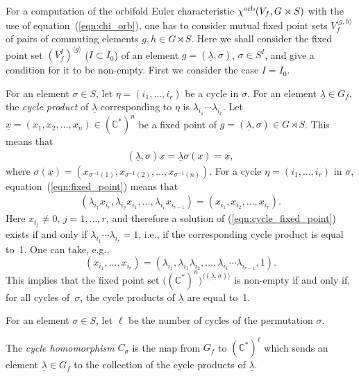 \documentclass[pdftex]{sigma}
\numberwithin{equation}{section}
\begin{document}
For a computation of the orbifold Euler characteristic ${\chi}^{\rm orb}(V_f, G \rtimes S)$ with the use of
equation~(\ref{eqn:chi_orb}), one has to consider mutual fixed point sets $V_f^{\langle g,h\rangle}$ of pairs of
commuting elements $g, h\in G \rtimes S$. Here we shall consider the fixed point set
$(V_f^I)^{\langle g\rangle}$ ($I\subset I_0$) of an element $g=(\underline{\lambda}, \sigma)$, $\sigma \in S^I$,
and give a condition for it to be non-empty. First we consider the case $I=I_0$.

For an element $\sigma\in S$, let $\eta=(i_1,\dots, i_r)$ be a cycle in $\sigma$. For an element
$\underline{\lambda}\in G_f$, the {\em cycle product} of $\underline{\lambda}$ corresponding to $\eta$ is
$\lambda_{i_1}\cdots \lambda_{i_r}$. Let $\underline{x}=(x_1, x_2,\dots, x_n)\in ({\mathbb C}^*)^n$ be a fixed point of $g=(\underline{\lambda}, \sigma)\in G \rtimes S$. This means that
\begin{gather}\label{eqn:fixed_point}
(\underline{\lambda}, \sigma)\underline{x}=\underline{\lambda}\sigma(\underline{x})=\underline{x} ,
\end{gather}
where $\sigma(\underline{x})=(x_{\sigma^{-1}(1)}, x_{\sigma^{-1}(2)},\dots, x_{\sigma^{-1}(n)})$.
For a cycle $\eta=(i_1,\dots, i_r)$ in $\sigma$, equation~(\ref{eqn:fixed_point}) means that
\begin{gather}\label{eqn:cycle_fixed_point}
(\lambda_{i_1}x_{i_r}, \lambda_{i_2}x_{i_1},\dots, \lambda_{i_r}x_{i_{r-1}})=(x_{i_1}, x_{i_2},\dots, x_{i_r}) .
\end{gather}
Here $x_{i_j} \neq 0$, $j=1, \dots , r$, and therefore a solution of (\ref{eqn:cycle_fixed_point}) exists if and only if $\lambda_{i_1} \cdots \lambda_{i_r}=1$, i.e., if the corresponding cycle product is equal to~1. One can take, e.g.,
\[
(x_{i_1}, \dots , x_{i_r})=
(\lambda_{i_1}, \lambda_{i_1}\lambda_{i_2}, \dots , \lambda_{i_1} \cdots \lambda_{i_{r-1}},1).
\]
This implies that the fixed point set $\big(({\mathbb C}^*)^n\big)^{\langle (\underline{\lambda},\sigma) \rangle}$ is non-empty if and only if, for all cycles of~$\sigma$, the cycle products of $\underline{\lambda}$ are equal to~1.

For an element $\sigma \in S$, let $\ell$ be the number of cycles of the permutation $\sigma$.

\begin{Definition} The {\em cycle homomorphism} $C_\sigma$ is the map from $G_f$ to $({\mathbb C}^*)^\ell$ which sends an element $\underline{\lambda} \in G_f$ to the collection of the cycle products of $\underline{\lambda}$.
\end{Definition}
\end{document}
